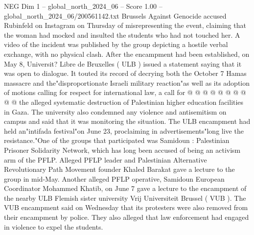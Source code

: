 \begin{textsample}{NEG Dim 1 – global\_north\_2024\_06 – Score 1.00 – global\_north\_2024\_06/200561142.txt}
Brussels Against Genocide accused Rubinfeld on Instagram on Thursday of misrepresenting the event, claiming that the woman had mocked and insulted the students who had not touched her.
A video of the incident was published by the group depicting a hostile verbal exchange, with no physical clash.
After the encampment had been established, on May 8, Universit?
Libre de Bruxelles ( ULB ) issued a statement saying that it was open to dialogue.
It touted its record of decrying both the October 7 Hamas massacre and the"disproportionate Israeli military reaction"as well as its adoption of motions calling for respect for international law, a call for @ @ @ @ @ @ @ @ @ @ the alleged systematic destruction of Palestinian higher education facilities in Gaza.
The university also condemned any violence and antisemitism on campus and said that it was monitoring the situation.
The ULB encampment had held an"intifada festival"on June 23, proclaiming in advertisements"long live the resistance."One of the groups that participated was Samidoun : Palestinian Prisoner Solidarity Network, which has long been accused of being an activism arm of the PFLP.
Alleged PFLP leader and Palestinian Alternative Revolutionary Path Movement founder Khaled Barakat gave a lecture to the group in mid-May.
Another alleged PFLP operative, Samidoun European Coordinator Mohammed Khatib, on June 7 gave a lecture to the encampment of the nearby ULB Flemish sister university Vrij Universiteit Brussel ( VUB ).
The VUB encampment said on Wednesday that its protesters were also removed from their encampment by police.
They also alleged that law enforcement had engaged in violence to expel the students.

\end{textsample}
